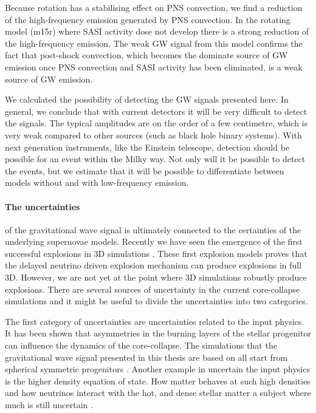 Because rotation has a stabilising effect on PNS convection, we find a reduction of the high-frequency emission generated
by PNS convection. In the rotating model (m15r) where SASI activity dose not develop there is a strong reduction of the high-frequency
emission. The weak GW signal from this model confirms the fact that post-shock convection, which becomes the dominate source of GW emission once
PNS convection and SASI activity has been eliminated, is a weak source of GW emission.

We calculated the possibility of detecting the GW signals presented here. In general, we conclude that 
with current detectors it will be very difficult to detect the signals. The typical amplitudes are
on the order of a few centimetre, which is very weak compared to other sources (such as black hole binary systems).
With next generation instruments, like the Einstein telescope, detection should be possible for an event within the 
Milky way. Not only will it be possible to detect the events, but we estimate that it will be possible to
differentiate between models without and with low-frequency emission.

\paragraph{The uncertainties}of the gravitational wave signal is ultimately connected to the certainties
of the underlying supernovae models. Recently we have seen the emergence of the first successful explosions 
in 3D simulations \citep{melson_15a,melson_15b,lentz_15,suma_models}. 
These first explosion models proves that the delayed neutrino driven explosion mechanism can produce explosions in full 3D. 
However, we are not yet at the point where 3D simulations robustly produce explosions. 
There are several sources of uncertainty in the current core-collapse simulations and 
it might be useful to divide the uncertainties into two categories. 

The first category of uncertainties are uncertainties related to the input physics. 
It has been shown that asymmetries in the burning layers of the stellar progenitor can influence the dynamics of the core-collapse. 
The simulations that the gravitational wave signal presented in this thesis are based on all start from spherical symmetric progenitors
\citep{burrows_96,fryer_04,arnett_11,couch_13,mueller_15a}. 
Another example in uncertain the input physics is the higher density equation of state. 
How matter behaves at such high densities and how neutrinos interact with the hot, and dense 
stellar matter a subject where much is still uncertain \citep{fischer_14,lattimer_16}.

